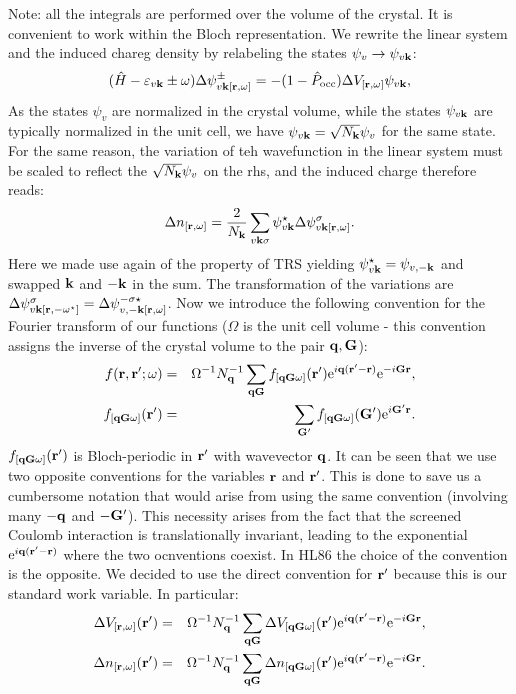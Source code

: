 \documentclass[twocolumn,prb,showpacs,superscriptaddress]{revtex4}
\def\w{\omega}
\def\H{\hat{H}}
\def\P{\hat{P}_{\rm occ}}
\def\E{\varepsilon}
\def\q{{\bf q}}
\def\s{\sigma}
\def\k{{\bf k}}
\def\G{{\bf G}}
\def\Gp{{\bf G^\prime}}
\def\r{{\bf r}}
\def\rp{{\bf r^\prime}}
\begin{document}
Note: all the integrals are performed over the volume of the crystal.
It is convenient to work within the Bloch representation. We rewrite the
linear system and the induced chareg density by relabeling the states
$\psi_v\rightarrow \psi_{v\k}$:
  \begin{equation}
  (\H-\E_{v\k}\pm\w) \Delta \psi^\pm_{v\k[\r,\w]}  = -(1-\P)  \Delta V_{[\r,\w]} \psi_{v\k},
  \end{equation}
As the states $\psi_v$ are normalized 
in the crystal volume, while the states $\psi_{v\k}$ are typically normalized
in the unit cell, we have $\psi_{v\k} = \sqrt{N_\k} \psi_v$ for the same state.
For the same reason, the variation of teh wavefunction in the linear system
must be scaled to reflect the $\sqrt{N_\k} \psi_v$ on the rhs, and the induced charge
therefore reads:
  \begin{equation}
  \Delta n_{[\r,\w]} = \frac{2}{N_\k}\sum_{v\k\s} \psi_{v\k}^\star  \Delta \psi^\s_{v\k[\r,\w]}.
  \end{equation}
Here we made use again of the property of TRS yielding $\psi_{v\k}^\star=\psi_{v,-\k}$
and swapped $\k$ and $-\k$ in the sum.
The transformation of the variations are $\Delta \psi^\s_{v\k[\r,-\w^\star]}=\Delta \psi^{-\s\star}_{v,-\k[\r,\w]}$.
%
Now we introduce the following convention for the Fourier transform of our functions
($\Omega$ is the unit cell volume - this convention assigns the inverse of the crystal
volume to the pair $\q,\G$):
  \begin{eqnarray}
  f(\r,\rp;\w) & = & \Omega^{-1}N_\q^{-1} \sum_{\q\G} f_{[\q\G\w]}(\rp) {\rm e}^{i\q(\rp-\r)} {\rm e}^{-i\G\r}, \\
  f_{[\q\G\w]}(\rp) & = & \sum_\Gp f_{[\q\G\w]}(\Gp) {\rm e}^{i\Gp\r}.
  \end{eqnarray}
$f_{[\q\G\w]}(\rp)$ is Bloch-periodic in $\rp$ with wavevector $\q$.
It can be seen that we use two opposite conventions for the variables $\r$ and $\rp$.
This is done to save us a cumbersome notation that would arise from using the same
convention (involving many $-\q$ and $-\Gp$). This necessity arises from the fact
that the screened Coulomb interaction is translationally invariant, leading to 
the exponential ${\rm e}^{i\q(\rp-\r)}$ where the two ocnventions coexist.
In HL86 the choice of the convention is the opposite. We decided to use the
direct convention for $\rp$ because this is our standard work variable.
In particular:
  \begin{eqnarray}
  \Delta V_{[\r,\w]} (\rp) & = & \Omega^{-1}N_\q^{-1}  \sum_{\q\G} \Delta V_{[\q\G\w]}(\rp) {\rm e}^{i\q(\rp-\r)} {\rm e}^{-i\G\r}, \nonumber \\
  \Delta n_{[\r,\w]} (\rp) & = & \Omega^{-1}N_\q^{-1}  \sum_{\q\G} \Delta n_{[\q\G\w]}(\rp) {\rm e}^{i\q(\rp-\r)} {\rm e}^{-i\G\r}. \nonumber 
  \end{eqnarray}
\end{document}
